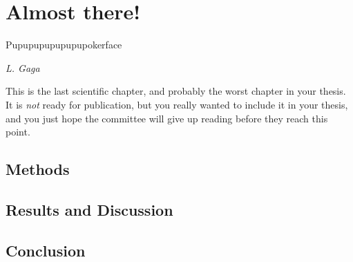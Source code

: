 \cleardoubleevenemptypage
\chapter{Almost there!}
\label{ch:ch6}
\pgfmathsetmacro\chapclr{\colourarray[6]}
\hypersetup{
  citecolor  = \chapclr,
  linkcolor  = \chapclr,
  urlcolor   = \chapclr,
}

\epigraph{
  Pupupupupupupupokerface
}{
  \textit{L. Gaga}
}

\begin{center}
  \begin{minipage}{\abstractwidth\textwidth}
    \begin{small}
    This is the last scientific chapter, and probably the worst chapter in your thesis. It is \emph{not} ready for publication, but you really wanted to include it in your thesis, and you just hope the committee will give up reading before they reach this point. 
    \end{small}
  \end{minipage}
  \vspace{0.5cm}
\end{center}

\clearpage

\blindtext[2]

\section{Methods}
\blindtext[1]
\blindmathfalse
\blindtext[1]

\section{Results and Discussion}
\blindtext[3]


\section{Conclusion}
\lipsum[1-2]